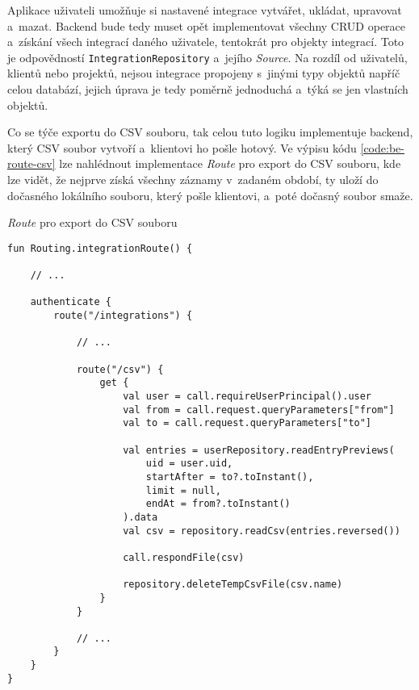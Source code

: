 Aplikace uživateli umožňuje si nastavené integrace vytvářet, ukládat, upravovat a~mazat. Backend bude tedy muset opět implementovat všechny CRUD operace a~získání všech integrací daného uživatele, tentokrát pro objekty integrací. Toto je odpovědností \texttt{IntegrationRepository} a~jejího \emph{Source}. Na rozdíl od uživatelů, klientů nebo projektů, nejsou integrace propojeny s~jinými typy objektů napříč celou databází, jejich úprava je tedy poměrně jednoduchá a~týká se jen vlastních objektů.

Co se týče exportu do CSV souboru, tak celou tuto logiku implementuje backend, který CSV soubor vytvoří a~klientovi ho pošle hotový. Ve výpisu kódu \ref{code:be-route-csv} lze nahlédnout implementace \emph{Route} pro export do CSV souboru, kde lze vidět, že nejprve získá všechny záznamy v~zadaném období, ty uloží do dočasného lokálního souboru, který pošle klientovi, a~poté dočasný soubor smaže.

\begin{listing}
\caption{\emph{Route} pro export do CSV souboru}\label{code:be-route-csv}
\begin{verbatim}
fun Routing.integrationRoute() {

    // ...
    
    authenticate {
        route("/integrations") {
        
            // ...
            
            route("/csv") {
                get {
                    val user = call.requireUserPrincipal().user
                    val from = call.request.queryParameters["from"]
                    val to = call.request.queryParameters["to"]

                    val entries = userRepository.readEntryPreviews(
                        uid = user.uid,
                        startAfter = to?.toInstant(),
                        limit = null,
                        endAt = from?.toInstant()
                    ).data
                    val csv = repository.readCsv(entries.reversed())

                    call.respondFile(csv)

                    repository.deleteTempCsvFile(csv.name)
                }
            }
            
            // ...
        }
    }
}       
\end{verbatim}
\end{listing}

